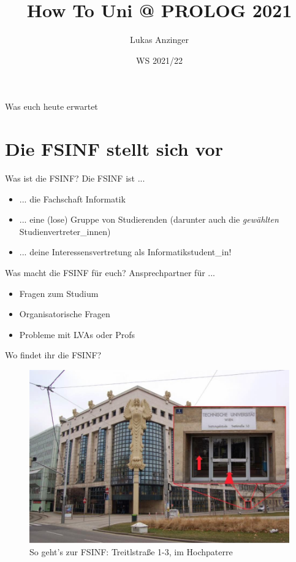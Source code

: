 \documentclass{beamer}
\title{How To Uni @ PROLOG 2021}
\date{WS 2021/22}
\author{Lukas Anzinger}
\begin{document}
\begin{frame}
    \maketitle
\end{frame}

\begin{frame}{Was euch heute erwartet}
    \setcounter{tocdepth}{1}
    \tableofcontents
\end{frame}

\section{Die FSINF stellt sich vor}

\begin{frame}{Was ist die FSINF?}
    Die FSINF ist ...
    \begin{itemize}
        \item ... die Fachschaft Informatik
        \item ... eine (lose) Gruppe von Studierenden (darunter auch die
            \textit{gewählten} Studienvertreter\_innen)
        \item ... deine Interessensvertretung als Informatikstudent\_in!
    \end{itemize}
\end{frame}

\begin{frame}{Was macht die FSINF für euch?}
    Ansprechpartner für ...
    \begin{itemize}
        \item Fragen zum Studium
        \item Organisatorische Fragen
        \item Probleme mit LVAs oder Profs
    \end{itemize}
\end{frame}

\begin{frame}{Wo findet ihr die FSINF?}
    \begin{figure}[htp]
        \centering
        \includegraphics[width=\textwidth]{fsinf.jpg}
        \caption{So geht's zur FSINF: Treitlstraße 1-3, im Hochpaterre}
    \end{figure}
\end{frame}
\end{document}
